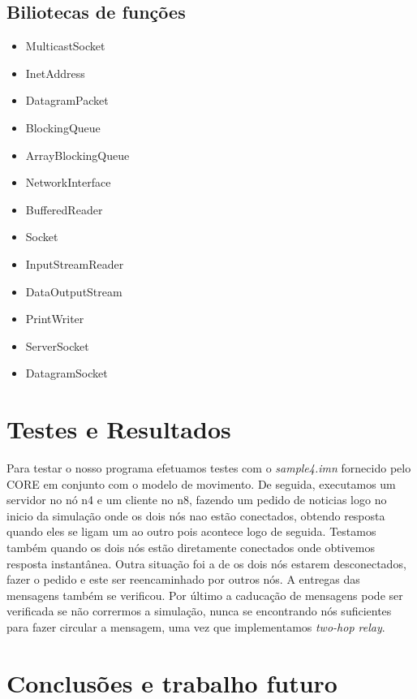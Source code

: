 \documentclass{llncs}
\begin{document}
\subsection{Biliotecas de funções}

\begin{itemize}
    \item MulticastSocket
    \item InetAddress
    \item DatagramPacket
    \item BlockingQueue
    \item ArrayBlockingQueue
    \item NetworkInterface
    \item BufferedReader
    \item Socket
    \item InputStreamReader
    \item DataOutputStream
    \item PrintWriter
    \item ServerSocket
    \item DatagramSocket
\end{itemize}

\section{Testes e Resultados}

Para testar o nosso programa efetuamos testes com o \emph{sample4.imn} fornecido pelo CORE em conjunto com o modelo de movimento. De seguida, executamos um servidor no nó n4 e um cliente no n8, fazendo um pedido de noticias logo no inicio da simulação onde os dois nós nao estão conectados, obtendo resposta quando eles se ligam um ao outro pois acontece logo de seguida. Testamos também quando os dois nós estão diretamente conectados onde obtivemos resposta instantânea. Outra situação foi a de os dois nós estarem desconectados, fazer o pedido e este ser reencaminhado por outros nós. A entregas das mensagens também se verificou. Por último a caducação de mensagens pode ser verificada se não corrermos a simulação, nunca se encontrando nós suficientes para fazer circular a mensagem, uma vez que implementamos \emph{two-hop relay}.

\section{Conclusões e trabalho futuro}
\end{document}
